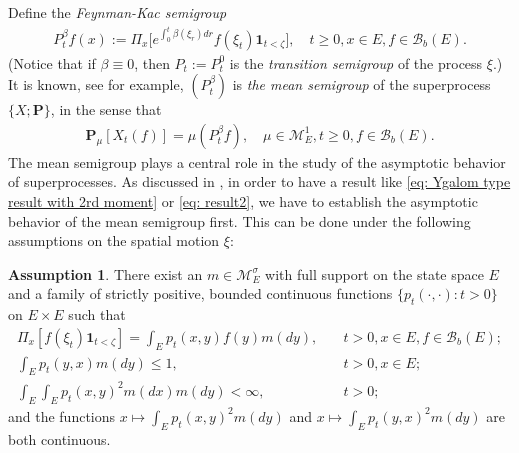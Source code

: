 \documentclass[UTF8]{pkuthss}
\theoremstyle{plain}
\theoremstyle{definition}
\newtheorem{asp}{Assumption}[chapter]
\numberwithin{equation}{section}
\begin{document}
	Define the \emph{Feynman-Kac semigroup}
\begin{align}
	P^\beta_tf(x)
	:= \Pi_x \big[e^{\int_0^{t} \beta(\xi_r)dr} f(\xi_t)\mathbf 1_{t<\zeta}\big],
	\quad t\geq 0, x\in E, f\in \mathscr B_b(E).
\end{align}
	(Notice that if $\beta \equiv 0$, then $P_t:= P^0_t$ is the \emph{transition semigroup} of the process $\xi$.)
	It is known, see \cite[Proposition 2.27]{Li2011Measure-valued} for example, $(P^\beta_t)$ is \emph{the mean semigroup} of the superprocess $\{X; \mathbf P\}$, in the sense that
\begin{align} \label{eq: Ygalom type result without 2rd moment}
	\mathbf P_\mu [X_t(f)]
	= \mu(P^\beta_t f),
	\quad \mu \in \mathcal M^1_E,
	t \geq 0,f \in \mathscr B_b(E).
\end{align}
    The  mean semigroup plays a central role in the study of the asymptotic behavior of superprocesses.
	As discussed in \cite{EvansPerkins1990Measure-valued}, in order to have a result like \eqref{eq: Ygalom type result with 2rd moment} or \eqref{eq: result2}, we have to establish the asymptotic behavior of the mean semigroup first.
	This can be done under the following assumptions on the spatial motion $\xi$:
\begin{asp} \label{asp: 1}
    There exist an $m \in \mathcal M_E^\sigma$ with full support on the state space $E$ and a family of strictly positive,
	bounded continuous functions $\{ p_t(\cdot,\cdot): t > 0 \}$ on $E \times E$ such that
\begin{align}
	\Pi_x[ f(\xi_t)\mathbf 1_{t < \zeta} ]
	= \int_E p_t(x,y) f(y) m(dy),
	&\quad t>0, x \in E,f \in \mathscr B_b(E);
	\\\int_E p_t(y,x)m(dy)
	\leq 1,	
	&\quad t>0,x\in E;
	\\\int_E \int_E p_t(x,y)^2 m(dx) m(dy)
	<\infty,
	&\quad t> 0;
\end{align}
	and the functions $x \mapsto \int_E p_t(x,y)^2 m(dy)$ and $x \mapsto \int_E p_t(y,x)^2 m(dy)$ are both continuous.
\end{asp}
\end{document}
